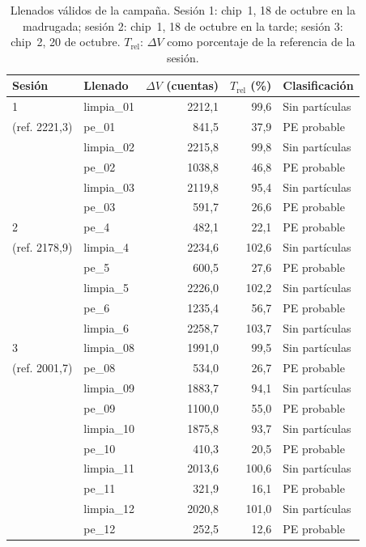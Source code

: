 \begin{table}[htbp]
  \centering
  \caption{Llenados válidos de la campaña. Sesión 1: chip~1, 18 de octubre en la
    madrugada; sesión 2: chip~1, 18 de octubre en la tarde; sesión 3: chip~2, 20 de
    octubre. $T_{\mathrm{rel}}$: $\Delta V$ como porcentaje de la referencia de la sesión.}
  \label{tab:campana_llenados}
  \small
  \begin{tabular}{llrrl}
    \hline
    Sesión & Llenado & $\Delta V$ (cuentas) & $T_{\mathrm{rel}}$ (\%) & Clasificación \\
    \hline
    1 & limpia\_01 & 2212,1 & 99,6  & Sin partículas \\
    (ref. 2221,3) & pe\_01     & 841,5  & 37,9  & PE probable \\
              & limpia\_02 & 2215,8 & 99,8  & Sin partículas \\
              & pe\_02     & 1038,8 & 46,8  & PE probable \\
              & limpia\_03 & 2119,8 & 95,4  & Sin partículas \\
              & pe\_03     & 591,7  & 26,6  & PE probable \\
    \hline
    2 & pe\_4      & 482,1  & 22,1  & PE probable \\
    (ref. 2178,9) & limpia\_4  & 2234,6 & 102,6 & Sin partículas \\
              & pe\_5      & 600,5  & 27,6  & PE probable \\
              & limpia\_5  & 2226,0 & 102,2 & Sin partículas \\
              & pe\_6      & 1235,4 & 56,7  & PE probable \\
              & limpia\_6  & 2258,7 & 103,7 & Sin partículas \\
    \hline
    3 & limpia\_08 & 1991,0 & 99,5  & Sin partículas \\
    (ref. 2001,7) & pe\_08     & 534,0  & 26,7  & PE probable \\
              & limpia\_09 & 1883,7 & 94,1  & Sin partículas \\
              & pe\_09     & 1100,0 & 55,0  & PE probable \\
              & limpia\_10 & 1875,8 & 93,7  & Sin partículas \\
              & pe\_10     & 410,3  & 20,5  & PE probable \\
              & limpia\_11 & 2013,6 & 100,6 & Sin partículas \\
              & pe\_11     & 321,9  & 16,1  & PE probable \\
              & limpia\_12 & 2020,8 & 101,0 & Sin partículas \\
              & pe\_12     & 252,5  & 12,6  & PE probable \\
    \hline
  \end{tabular}
\end{table}


